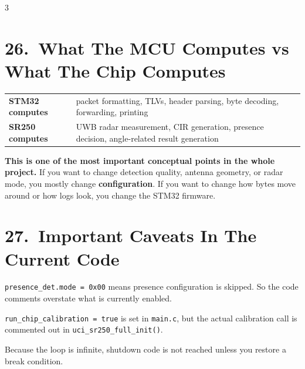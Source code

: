 \documentclass[10pt]{article}
\begin{document}
\begin{multicols*}{3}
\section*{26.\ What The MCU Computes vs What The Chip Computes}

\begin{tcolorbox}[newbox={Responsibility Split}]
\begin{tabular}{@{}p{2.5cm}p{4.6cm}@{}}
\textbf{STM32 computes} & packet formatting, TLVs, header parsing, byte decoding, forwarding, printing \\
\textbf{SR250 computes} & UWB radar measurement, CIR generation, presence decision, angle-related result generation \\
\end{tabular}
\end{tcolorbox}

\textbf{This is one of the most important conceptual points in the whole project.}
If you want to change detection quality, antenna geometry, or radar mode, you mostly change \textbf{configuration}. If you want to change how bytes move around or how logs look, you change the STM32 firmware.

\section*{27.\ Important Caveats In The Current Code}

\begin{tcolorbox}[warnbox={Caveat 1 --- Presence Not Actually Enabled}]
\texttt{presence\_det.mode = 0x00} means presence configuration is skipped.
So the code comments overstate what is currently enabled.
\end{tcolorbox}

\begin{tcolorbox}[warnbox={Caveat 2 --- Calibration Flag Not Used}]
\texttt{run\_chip\_calibration = true} is set in \texttt{main.c}, but the actual calibration call is commented out in \texttt{uci\_sr250\_full\_init()}.
\end{tcolorbox}

\begin{tcolorbox}[warnbox={Caveat 3 --- Stop/Deinit Unreachable}]
Because the loop is infinite, shutdown code is not reached unless you restore a break condition.
\end{tcolorbox}


\end{multicols*}
\end{document}
